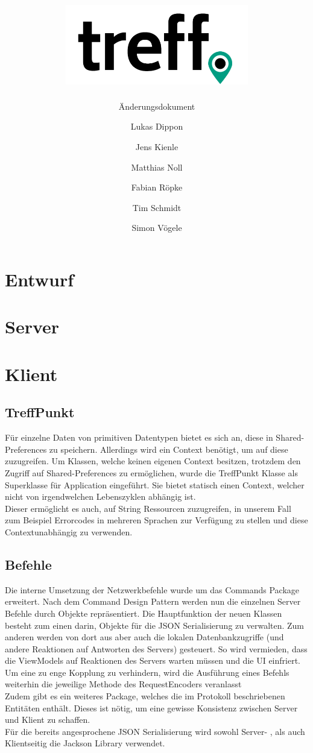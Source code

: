 \documentclass[parskip=full,11pt]{scrartcl}
\title{\includegraphics[width = 80mm]{images/logo_crop.png}}
\subtitle{\huge Änderungsdokument}
\author{Lukas Dippon
        \and Jens Kienle
        \and Matthias Noll
        \and Fabian Röpke
        \and Tim Schmidt
        \and Simon Vögele}
\begin{document}
\maketitle
\thispagestyle{empty} %

\pagebreak
\tableofcontents

\pagebreak
\section{Entwurf}



\pagebreak
\section{Server}



\pagebreak
\section{Klient}

\subsection{TreffPunkt}
Für einzelne Daten von primitiven Datentypen bietet es sich an, diese in
Shared-Preferences zu speichern. Allerdings wird ein Context benötigt, um auf
diese zuzugreifen. Um Klassen, welche keinen eigenen Context besitzen, trotzdem
den Zugriff auf Shared-Preferences zu ermöglichen, wurde die TreffPunkt Klasse
als Superklasse für Application eingeführt. Sie bietet statisch einen Context,
welcher nicht von irgendwelchen Lebenszyklen abhängig ist.\\
Dieser ermöglicht es auch, auf String Ressourcen zuzugreifen, in unserem Fall
zum Beispiel Errorcodes in mehreren Sprachen zur Verfügung zu stellen und diese
Contextunabhängig zu verwenden.

\subsection{Befehle}
Die interne Umsetzung der Netzwerkbefehle wurde um das Commands Package
erweitert. Nach dem Command Design Pattern werden nun die einzelnen Server
Befehle durch Objekte repräsentiert. Die Hauptfunktion der neuen Klassen
besteht zum einen darin, Objekte für die JSON Serialisierung zu verwalten. Zum
anderen werden von dort aus aber auch die lokalen Datenbankzugriffe (und
andere Reaktionen auf Antworten des Servers) gesteuert. So wird vermieden, dass
die ViewModels auf Reaktionen des Servers warten müssen und die UI einfriert.
Um eine zu enge Kopplung zu verhindern, wird die Ausführung eines Befehls
weiterhin die jeweilige Methode des RequestEncoders veranlasst\\
Zudem gibt es ein weiteres Package, welches die im Protokoll beschriebenen
Entitäten enthält. Dieses ist nötig, um eine gewisse Konsistenz zwischen Server
und Klient zu schaffen.\\
Für die bereits angesprochene JSON Serialisierung wird sowohl Server- , als
auch Klientseitig die Jackson Library verwendet.
\end{document}
